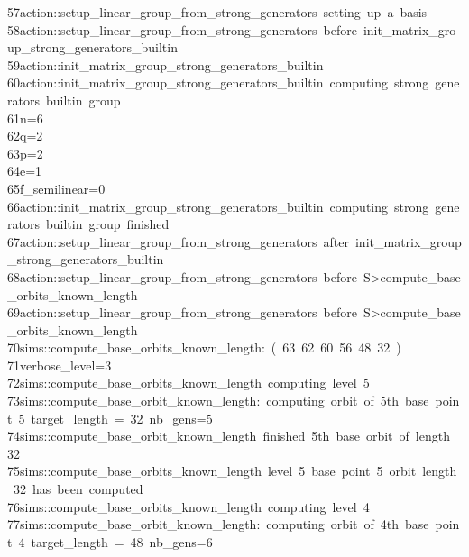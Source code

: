 \begin{tabbing}
57\>action::setup\_linear\_group\_from\_strong\_generators\ setting\ up\ a\ basis\\[0pt]
58\>action::setup\_linear\_group\_from\_strong\_generators\ before\ init\_matrix\_group\_strong\_generators\_builtin\\[0pt]
59\>action::init\_matrix\_group\_strong\_generators\_builtin\\[0pt]
60\>action::init\_matrix\_group\_strong\_generators\_builtin\ computing\ strong\ generators\ builtin\ group\\[0pt]
61\>n=6\\[0pt]
62\>q=2\\[0pt]
63\>p=2\\[0pt]
64\>e=1\\[0pt]
65\>f\_semilinear=0\\[0pt]
66\>action::init\_matrix\_group\_strong\_generators\_builtin\ computing\ strong\ generators\ builtin\ group\ finished\\[0pt]
67\>action::setup\_linear\_group\_from\_strong\_generators\ after\ init\_matrix\_group\_strong\_generators\_builtin\\[0pt]
68\>action::setup\_linear\_group\_from\_strong\_generators\ before\ S>compute\_base\_orbits\_known\_length\\[0pt]
69\>action::setup\_linear\_group\_from\_strong\_generators\ before\ S>compute\_base\_orbits\_known\_length\\[0pt]
70\>sims::compute\_base\_orbits\_known\_length:\ (\ 63\ 62\ 60\ 56\ 48\ 32\ )\\[0pt]
71\>verbose\_level=3\\[0pt]
72\>sims::compute\_base\_orbits\_known\_length\ computing\ level\ 5\\[0pt]
73\>sims::compute\_base\_orbit\_known\_length:\ computing\ orbit\ of\ 5th\ base\ point\ 5\ target\_length\ =\ 32\ nb\_gens=5\\[0pt]
74\>sims::compute\_base\_orbit\_known\_length\ finished\ 5th\ base\ orbit\ of\ length\ 32\\[0pt]
75\>sims::compute\_base\_orbits\_known\_length\ level\ 5\ base\ point\ 5\ orbit\ length\ 32\ has\ been\ computed\\[0pt]
76\>sims::compute\_base\_orbits\_known\_length\ computing\ level\ 4\\[0pt]
77\>sims::compute\_base\_orbit\_known\_length:\ computing\ orbit\ of\ 4th\ base\ point\ 4\ target\_length\ =\ 48\ nb\_gens=6\\[0pt]

\end{tabbing}

